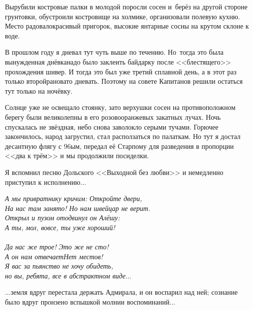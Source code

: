 Вырубили костровые палки в молодой поросли сосен и~берёз на другой стороне грунтовки, обустроили костровище на холмике, организовали полевую кухню. Место радовало\mdash красивый пригорок, высокие янтарные сосны на крутом склоне к воде. %

В прошлом году я дневал тут чуть выше по течению. Но~тогда это была вынужденная днёвка\mdash  надо было заклеить байдарку после <<блестящего>> прохождения шивер. И тогда это был уже третий сплавной день, а в этот раз только второй\mdash рановато дневать. Поэтому на совете Капитанов решили остаться тут только на ночёвку.

Солнце уже не освещало стоянку, зато верхушки сосен на противоположном берегу были великолепны в его розово\sdash оранжевых закатных лучах. Ночь спускалась не звёздная, небо снова заволокло серыми тучами. Горючее закончилось, народ загрустил, стал расползаться по палаткам. Но тут я достал десантную флягу с 96\sdash ым, передал её Старпому для разведения в пропорции <<два к трём>> и мы продолжили посиделки. 

Я вспомнил песню Дольского <<Выходной без любви>> и немедленно приступил к исполнению$\ldots$  

\vspace{0.5cm}
\noindent\textit{А мы привратнику кричим: Откройте двери, \\
На нас там занято! Но нам швейцар не верит. \\
Открыл и пузом отодвинул он Алёшу: \\
\diagdash А ты, мол, вовсе, ты уже хороший!\\
\\
\diagdash Да нас же трое! Это же не сто!\\
А он нам отвечает\mdash Нет местов!\\
Я вас за пьянство не хочу обидеть,\\
но вы, ребята, все в абстрактном виде$\ldots$ 
}
\vspace{0.5cm}

$\ldots$земля вдруг перестала держать Адмирала, и он воспарил над ней; сознание было вдруг пронзено вспышкой молнии воспоминаний$\ldots$




